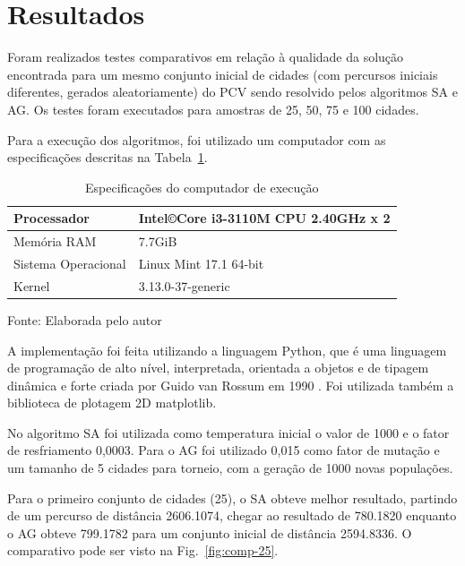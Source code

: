 \documentclass[journal, a4paper]{IEEEtran}
\begin{document}
\section{Resultados}
	Foram realizados testes comparativos em relação à qualidade da solução encontrada para um mesmo conjunto inicial de cidades (com percursos iniciais diferentes, gerados aleatoriamente) do PCV sendo resolvido pelos algoritmos SA e AG. Os testes foram executados para amostras de 25, 50, 75 e 100 cidades.

    Para a execução dos algoritmos, foi utilizado um computador com as especificações descritas na Tabela~\ref{tab:especificacoes}.

    \begin{table}[!hbt]
		\begin{center}
		\caption{Especificações do computador de execução}
		\label{tab:especificacoes}
		\begin{tabular}{|l|l|}
			\hline
			Processador  & Intel\copyright Core i3-3110M CPU 2.40GHz x 2 \\
			\hline
			Memória RAM & 7.7GiB \\
			\hline
			Sistema Operacional & Linux Mint 17.1 64-bit \\
			\hline
			Kernel & 3.13.0-37-generic \\
			\hline
		\end{tabular}
        \begin{tablenotes}
            Fonte: Elaborada pelo autor
        \end{tablenotes}
		\end{center}
	\end{table}

    A implementação foi feita utilizando a linguagem Python, que é uma linguagem de programação de alto nível, interpretada, orientada a objetos e de tipagem dinâmica e forte criada por Guido van Rossum em 1990 \cite{borges}. Foi utilizada também a biblioteca de plotagem 2D matplotlib.

    No algoritmo SA foi utilizada como temperatura inicial o valor de 1000 e o fator de resfriamento 0,0003. Para o AG foi utilizado 0,015 como fator de mutação e um tamanho de 5 cidades para torneio, com a geração de 1000 novas populações.

    Para o primeiro conjunto de cidades (25), o SA obteve melhor resultado, partindo de um percurso de distância 2606.1074, chegar ao resultado de 780.1820 enquanto o AG obteve 799.1782 para um conjunto inicial de distância 2594.8336. O comparativo pode ser visto na Fig.~\ref{fig:comp-25}.
\end{document}
